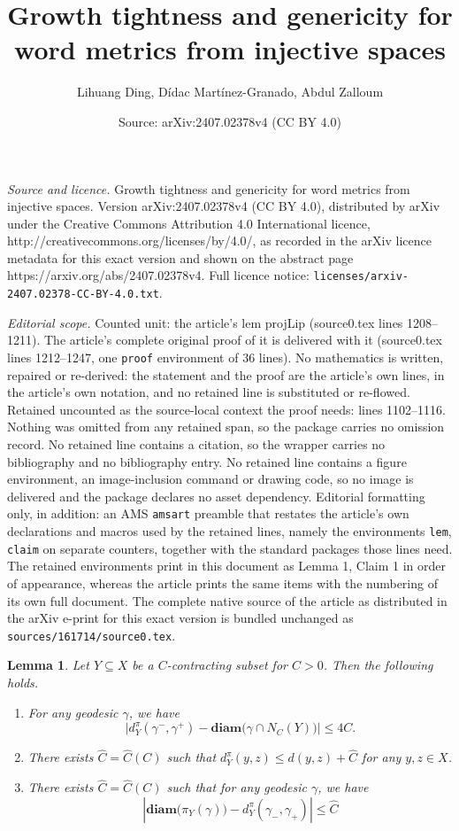 \documentclass[10pt,a4paper]{amsart}
\title{Growth tightness and genericity for word metrics from injective spaces}
\author{Lihuang Ding, D\'idac Mart\'inez-Granado, Abdul Zalloum}
\date{Source: arXiv:2407.02378v4 (CC BY 4.0)}
\newtheorem{lem}{Lemma}
\newcommand{\U}{X}
\newcommand{\diam }[1]{{\textbf{diam}\big(#1\big)}}
\begin{document}
\maketitle

\noindent\emph{Source and licence.} Growth tightness and genericity for word metrics from injective spaces. Version arXiv:2407.02378v4 (CC BY 4.0), distributed by arXiv under the Creative Commons Attribution 4.0 International licence, http://creativecommons.org/licenses/by/4.0/, as recorded in the arXiv licence metadata for this exact version and shown on the abstract page https://arxiv.org/abs/2407.02378v4. Full licence notice: \texttt{licenses/arxiv-2407.02378-CC-BY-4.0.txt}.\par\smallskip

\noindent\textit{Editorial scope.} Counted unit: the article's lem projLip (source0.tex lines 1208--1211). The article's complete original proof of it is delivered with it (source0.tex lines 1212--1247, one \texttt{proof} environment of 36 lines). No mathematics is written, repaired or re-derived: the statement and the proof are the article's own lines, in the article's own notation, and no retained line is substituted or re-flowed.  Retained uncounted as the source-local context the proof needs: lines 1102--1116.  Nothing was omitted from any retained span, so the package carries no omission record.  No retained line contains a citation, so the wrapper carries no bibliography and no bibliography entry.  No retained line contains a figure environment, an image-inclusion command or drawing code, so no image is delivered and the package declares no asset dependency.  Editorial formatting only, in addition: an AMS \texttt{amsart} preamble that restates the article's own declarations and macros used by the retained lines, namely the environments \texttt{lem}, \texttt{claim} on separate counters, together with the standard packages those lines need.  The retained environments print in this document as Lemma 1, Claim 1 in order of appearance, whereas the article prints the same items with the numbering of its own full document.  The complete native source of the article as distributed in the arXiv e-print for this exact version is bundled unchanged as \texttt{sources/161714/source0.tex}.
\begin{lem}\label{BigFive}
	Let $Y\subseteq \U$ be a  $C$-contracting subset for $C>0$. Then the following holds.
	
	\begin{enumerate}
		\item
		For any  geodesic $\gamma$, we have $$\big |d^{\pi}_Y(\gamma^-,\gamma^+)- \diam{\gamma\cap N_C(Y)}\big|\leq 4C.$$
		
		\item
		There exists $\hat C=\hat C(C)$ such that   $d^{\pi}_Y(y, z)\le d(y, z)+\hat C$ for any $y,z\in \U$.
		
		\item 
		There exists $\hat C=\hat C(C)$ such that for any geodesic $\gamma$, we have $$\left| \diam{\pi_Y(\gamma)} - d^{\pi}_Y(\gamma_-, \gamma_+) \right| \leq \hat C$$
		
	\end{enumerate}
\end{lem}
\end{document}
